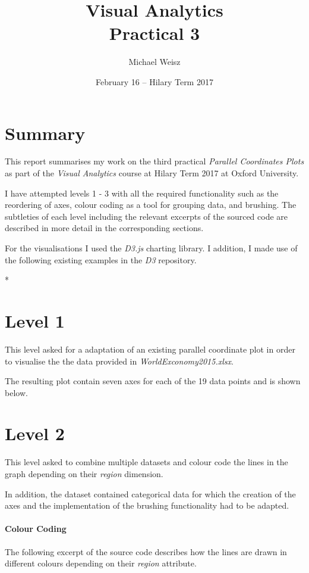 \documentclass[]{article}
\title{Visual Analytics \\ Practical 3}
\author{Michael Weisz}
\date{February 16 -- Hilary Term 2017 }
\begin{document}
\maketitle


\section*{Summary}
This report summarises my work on the third practical \emph{Parallel Coordinates Plots} as part of the \emph{Visual Analytics} course at Hilary Term 2017 at Oxford University.

I have attempted levels 1 - 3 with all the required functionality such as the reordering of axes, colour coding as a tool for grouping data, and brushing. The subtleties of each level including the relevant excerpts of the sourced code are described in more detail in the corresponding sections. 

For the visualisations I used the \emph{D3.js} 
charting library. I addition, I made use of the following existing examples in the \emph{D3} repository.

* 



\section*{Level 1}
This level asked for a adaptation of an existing parallel coordinate plot in order to visualise the the data provided in \emph{WorldExconomy2015.xlsx}.

The resulting plot contain seven axes for each of the 19 data points and is shown below. 




\section*{Level 2}
This level asked to combine multiple datasets and colour code the lines in the graph depending on their \emph{region} dimension. 

In addition, the dataset contained categorical data for which the creation of the axes and the implementation of the brushing functionality had to be adapted.

\paragraph{Colour Coding} The following excerpt of the source code describes how the lines are drawn in different colours depending on their \emph{region} attribute. 
\end{document}
